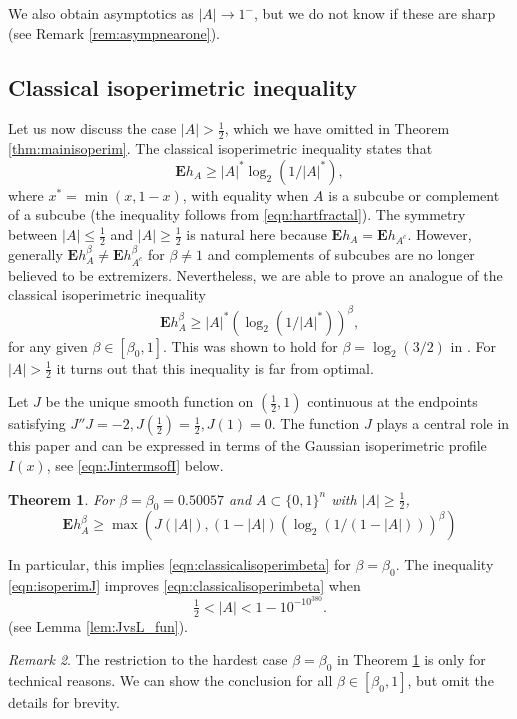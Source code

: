 \documentclass[12pt]{amsart}
\theoremstyle{plain}
\newtheorem{thm}{Theorem}[section]
\theoremstyle{definition}
\theoremstyle{remark}
\newtheorem{rem}[thm]{Remark}
\numberwithin{equation}{section}
\begin{document}
We also obtain asymptotics as $|A|\to 1^-$, but we do not know if these are sharp (see Remark \ref{rem:asympnearone}).

\subsection{Classical isoperimetric inequality}
Let us now discuss the case $|A|>\frac12$, which we have omitted in Theorem \ref{thm:mainisoperim}.
The classical isoperimetric inequality states that
\[ \mathbf{E}h_A \ge |A|^* \log_2(1/|A|^*),\]
where $x^*=\min(x,1-x)$, with equality when $A$ is a subcube or complement of a subcube (the inequality follows from \eqref{eqn:hartfractal}). 
The symmetry between $|A|\le \frac12$ and $|A|\ge \frac12$ is natural here because $\mathbf{E} h_A=\mathbf{E} h_{A^c}$. However, generally $\mathbf{E} h_A^\beta\not=\mathbf{E} h_{A^c}^\beta$ for $\beta\not=1$ and complements of subcubes are no longer believed to be extremizers.
Nevertheless, we are able to prove an analogue of the classical isoperimetric inequality
\begin{equation}\label{eqn:classicalisoperimbeta} \mathbf{E}h_A^\beta \ge |A|^* (\log_2(1/|A|^*))^\beta,
\end{equation}
for any given $\beta\in [\beta_0,1]$. This was shown to hold for $\beta=\log_2(3/2)$ in \cite{BIM23}. For $|A|>\frac12$ it turns out that this inequality is far from optimal. 

Let $J$ be the unique smooth function on $(\frac12,1)$ continuous at the endpoints satisfying $J''J=-2, J(\tfrac12)=\tfrac12, J(1)=0$.
The function $J$ plays a central role in this paper and can be expressed in terms of the Gaussian isoperimetric profile $I(x)$, see \eqref{eqn:JintermsofI} below.
\begin{thm}\label{thm:isoperimJ}
For $\beta=\beta_0=0.50057$ and $A\subset \{0,1\}^n$ with $|A|\ge \frac12$,
\begin{equation}\label{eqn:isoperimJ} \mathbf{E} h_A^{\beta} \ge \max(J(|A|), (1-|A|)(\log_2(1/(1-|A|)))^{\beta})
\end{equation}
\end{thm}
In particular, this implies \eqref{eqn:classicalisoperimbeta} for $\beta=\beta_0$. The inequality \eqref{eqn:isoperimJ} improves \eqref{eqn:classicalisoperimbeta} when 
\[\tfrac12<|A|< 1-10^{-10^{380}}.\]
(see Lemma \ref{lem:JvsL_fun}). 

\begin{rem}
The restriction to the hardest case $\beta=\beta_0$ in Theorem \ref{thm:isoperimJ} is only for technical reasons. We can show the conclusion for all $\beta\in [\beta_0,1]$, but omit the details for brevity.
\end{rem}
\end{document}
